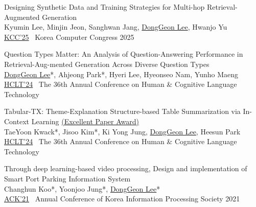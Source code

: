 \documentclass[11pt,a4paper]{article}
\newcounter{pubnum}
\newenvironment{publications}
{\begin{list}{}
    {\setlength{\leftmargin}{1.35in}
     \setlength{\itemsep}{0.5em}
     \setlength{\labelsep}{0em}
     \renewcommand{\makelabel}[1]{##1}}}
{\end{list}}
\newcommand{\pubitem}[1]{%
    \addtocounter{pubnum}{-1}%
    \item[\textup{[\arabic{pubnum}]}] #1%
}
\begin{document}
\begin{publications}
\pubitem{
    Designing Synthetic Data and Training Strategies for Multi-hop Retrieval-Augmented Generation\\
        Kyumin Lee, Minjin Jeon, Sanghwan Jang, \underline{DongGeon Lee}, Hwanjo Yu \\[3pt]
        \href{}{KCC'25} \textbar\ Korea Computer Congress 2025
}

\pubitem{
    Question Types Matter: An Analysis of Question-Answering Performance in Retrieval-Aug-mented Generation Across Diverse Question Types\\
        \underline{DongGeon Lee}*, Ahjeong Park*, Hyeri Lee, Hyeonseo Nam, Yunho Maeng \\[3pt]
        \href{https://koreascience.kr/article/CFKO202404272002603.page}{HCLT'24} \textbar\ The 36th Annual Conference on Human \& Cognitive Language Technology 
}

\pubitem{
    Tabular-TX: Theme-Explanation Structure-based Table Summarization via In-Context Learning \href{https://kli.korean.go.kr/benchmark/taskBoardsOrdtm/boardsOrdtm/noticeView.do?page=0&recordId=269&boardOrdtmId=&base.condition=boardOrdtm.title&base.keyword=&size=10}{(Excellent Paper Award)}\\
        TaeYoon Kwack*, Jisoo Kim*, Ki Yong Jung, \underline{DongGeon Lee}, Heesun Park  \\[3pt]
        \href{https://koreascience.kr/article/CFKO202404272003862.page}{HCLT'24} \textbar\ The 36th Annual Conference on Human \& Cognitive Language Technology
}

\pubitem{
    Through deep learning-based video processing, Design and implementation of Smart Port Parking Information System\\
        Changhun Koo*, Yoonjoo Jung*, \underline{DongGeon Lee}*\\[3pt]
        \href{https://doi.org/10.3745/PKIPS.y2021m11a.1342}{ACK'21} \textbar\ Annual Conference of Korea Information Processing Society 2021
}


\end{publications}

\vspace{1em}
\end{document}
